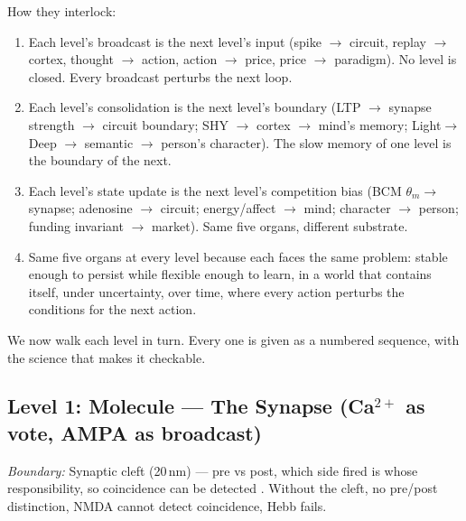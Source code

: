 \documentclass[11pt]{article}
\begin{document}
{How they interlock:
\begin{enumerate}
\item Each level's broadcast is the next level's input (spike $\to$\allowbreak{} circuit, replay $\to$\allowbreak{} cortex, thought $\to$\allowbreak{} action, action $\to$\allowbreak{} price, price $\to$\allowbreak{} paradigm). No level is closed. Every broadcast perturbs the next loop.
\item Each level's consolidation is the next level's boundary (LTP $\to$\allowbreak{} synapse strength $\to$\allowbreak{} circuit boundary; SHY $\to$\allowbreak{} cortex $\to$\allowbreak{} mind's memory; Light$\to$\allowbreak{}Deep $\to$\allowbreak{} semantic $\to$\allowbreak{} person's character). The slow memory of one level is the boundary of the next.
\item Each level's state update is the next level's competition bias (BCM $\theta_m \to$ synapse; adenosine $\to$\allowbreak{} circuit; energy/affect $\to$\allowbreak{} mind; character $\to$\allowbreak{} person; funding invariant $\to$\allowbreak{} market). Same five organs, different substrate.
\item Same five organs at every level because each faces the same problem: stable enough to persist while flexible enough to learn, in a world that contains itself, under uncertainty, over time, where every action perturbs the conditions for the next action.
\end{enumerate}

We now walk each level in turn. Every one is given as a numbered sequence, with the science that makes it checkable.

\subsection{Level 1: Molecule --- The Synapse (Ca$^{2+}$ as vote, AMPA as broadcast)}

\textit{Boundary:} Synaptic cleft (20\,nm) --- pre vs post, which side fired is whose responsibility, so coincidence can be detected \citep{tononi2014}. Without the cleft, no pre/post distinction, NMDA cannot detect coincidence, Hebb fails.

}
\end{document}
